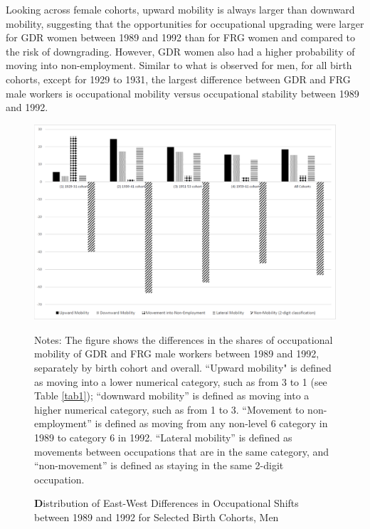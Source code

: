 \begin{Article}
\begin{refsection}[Spitz]
Looking across female cohorts, upward mobility is always larger than downward mobility, suggesting that the opportunities for occupational upgrading were larger for GDR women between 1989 and 1992 than for FRG women and compared to the risk of downgrading. However, GDR women also had a higher probability of moving into non-employment. Similar to what is observed for men, for all birth cohorts, except for 1929 to 1931, the largest difference between GDR and FRG male workers is occupational mobility versus occupational stability between 1989 and 1992. 

\begin{landscape}
    
\begin{figure}[!ht]
    \caption{\textbf Distribution of East-West Differences in Occupational Shifts between 1989 and 1992 for Selected Birth Cohorts, Men}\label{fig3}
    \begin{center}
    \includegraphics[width=.8\linewidth]{East_vs_West_Men.pdf}
    \vspace{-3.8cm}
    {\footnotesize
    \hspace*{0.1cm}\parbox[h]{\linewidth}{Notes: The figure shows the differences in the shares of occupational mobility of GDR and FRG male workers between 1989 and 1992, separately by birth cohort and overall. ``Upward mobility" is defined as moving into a lower numerical category, such as from 3 to 1 (see Table \ref{tab1}); ``downward mobility'' is defined as moving into a higher numerical category, such as from 1 to 3. ``Movement to non-employment'' is defined as moving from any non-level 6 category in 1989 to category 6 in 1992. ``Lateral mobility'' is defined as movements between occupations that are in the same category, and ``non-movement'' is defined as staying in the same 2-digit occupation.}}
    \end{center}
\end{figure}
\end{landscape}



\end{refsection}
\end{Article}
